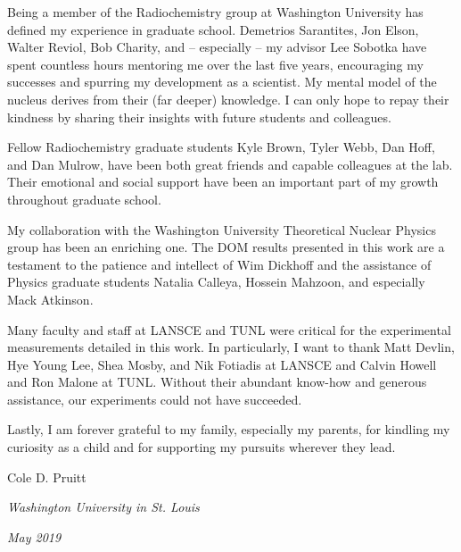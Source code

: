 Being a member of the Radiochemistry group at Washington University has defined
my experience in graduate school. Demetrios Sarantites, Jon Elson,
Walter Reviol, Bob Charity, and -- especially -- my advisor Lee Sobotka have spent
countless hours mentoring me over the last five years, encouraging my successes
and spurring my development as a scientist. My mental model of the nucleus derives from
their (far deeper) knowledge. I can only hope to repay
their kindness by sharing their insights with future students and colleagues.

Fellow Radiochemistry graduate students Kyle Brown, Tyler Webb, Dan Hoff, and Dan Mulrow,
have been both great friends and capable colleagues at the lab.
Their emotional and social support have been an important part of my
growth throughout graduate school.

My collaboration with the Washington University Theoretical Nuclear Physics group has
been an enriching one. The DOM results presented in this
work are a testament to the patience and intellect of Wim Dickhoff and 
the assistance of Physics graduate students Natalia Calleya,
Hossein Mahzoon, and especially Mack Atkinson.

Many faculty and staff at LANSCE and TUNL were critical for the 
experimental measurements detailed in this work. In particularly, I want to thank Matt
Devlin, Hye Young Lee, Shea Mosby, and Nik Fotiadis at LANSCE and Calvin Howell
and Ron Malone at TUNL. Without their abundant know-how and generous
assistance, our experiments could not have succeeded.

Lastly, I am forever grateful to my family, especially my parents, for
kindling my curiosity as a child and for supporting my pursuits wherever they
lead.

\vspace{20pt}

\begin{flushright}
  Cole D. Pruitt
\end{flushright}

\textit{Washington University in St. Louis}

\textit{May 2019}

\clearpage
